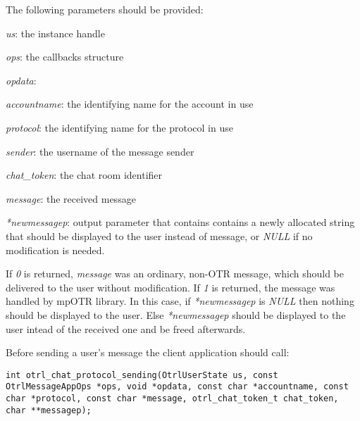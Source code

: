 The following parameters should be provided:
\begin{description}
  \item \emph{us}: the instance handle
  \item \emph{ops}: the callbacks structure
  \item \emph{opdata}: 
  \item \emph{accountname}: the identifying name for the account in use
  \item \emph{protocol}: the identifying name for the protocol in use
  \item \emph{sender}: the username of the message sender
  \item \emph{chat\_token}: the chat room identifier
  \item \emph{message}: the received message
  \item \emph{*newmessagep}: output parameter that contains contains a newly allocated string that should be displayed to the user instead of message, or \emph{NULL} if no modification is needed.
\end{description}
If \emph{0} is returned, \emph{message} was an ordinary, non-OTR message, which should be delivered to the user without modification. If \emph{1} is returned, the message was handled by mpOTR library. In this case, if \emph{*newmessagep} is \emph{NULL} then nothing should be displayed to the user. Else \emph{*newmessagep} should be displayed to the user intead of the received one and be freed afterwards.

Before sending a user's message the client application should call:
\begin{lstlisting}[caption={The sending messages handling function}]
int otrl_chat_protocol_sending(OtrlUserState us, const OtrlMessageAppOps *ops, void *opdata, const char *accountname, const char *protocol, const char *message, otrl_chat_token_t chat_token, char **messagep);
\end{lstlisting}

